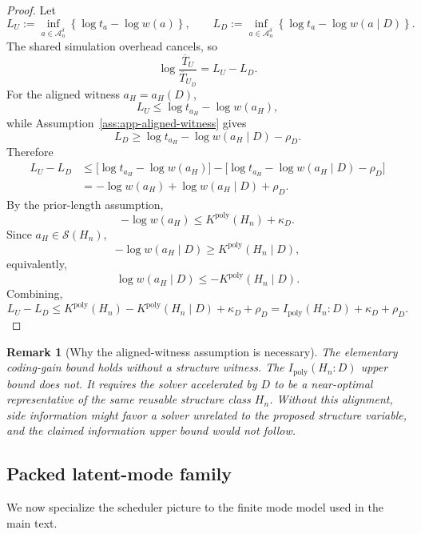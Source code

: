 \documentclass{article}
\newtheorem{remark}{Remark}
\newcommand{\cA}{\mathcal{A}}
\newcommand{\cS}{\mathcal{S}}
\begin{document}
\begin{proof}
Let
\[
    L_U:=\inf_{a\in\cA_n^\delta}\left\{\log t_a-\log w(a)\right\},
    \qquad
    L_D:=\inf_{a\in\cA_n^\delta}\left\{\log t_a-\log w(a\mid D)\right\}.
\]
The shared simulation overhead cancels, so
\[
    \log\frac{\overline T_U}{\overline T_{U_D}}
    =
    L_U-L_D.
\]
For the aligned witness \(a_H=a_H(D)\),
\[
    L_U
    \le
    \log t_{a_H}-\log w(a_H),
\]
while Assumption~\ref{ass:app-aligned-witness} gives
\[
    L_D
    \ge
    \log t_{a_H}-\log w(a_H\mid D)-\rho_D.
\]
Therefore
\[
\begin{aligned}
    L_U-L_D
    &\le
    \bigl[\log t_{a_H}-\log w(a_H)\bigr]
    -
    \bigl[\log t_{a_H}-\log w(a_H\mid D)-\rho_D\bigr]
    \\
    &=
    -\log w(a_H)+\log w(a_H\mid D)+\rho_D.
\end{aligned}
\]
By the prior-length assumption,
\[
    -\log w(a_H)\le K^{\mathrm{poly}}(H_n)+\kappa_D.
\]
Since \(a_H\in\cS(H_n)\),
\[
    -\log w(a_H\mid D)\ge K^{\mathrm{poly}}(H_n\mid D),
\]
equivalently,
\[
    \log w(a_H\mid D)\le -K^{\mathrm{poly}}(H_n\mid D).
\]
Combining,
\[
    L_U-L_D
    \le
    K^{\mathrm{poly}}(H_n)-K^{\mathrm{poly}}(H_n\mid D)+\kappa_D+\rho_D
    =
    I_{\mathrm{poly}}(H_n:D)+\kappa_D+\rho_D .
\]
\end{proof}

\begin{remark}[Why the aligned-witness assumption is necessary]
The elementary coding-gain bound holds without a structure witness.
The \(I_{\mathrm{poly}}(H_n:D)\) upper bound does not.
It requires the solver accelerated by \(D\) to be a near-optimal representative of the
same reusable structure class \(H_n\).
Without this alignment, side information might favor a solver unrelated to the proposed
structure variable, and the claimed information upper bound would not follow.
\end{remark}

\subsection{Packed latent-mode family}

We now specialize the scheduler picture to the finite mode model used in the main text.
\end{document}
